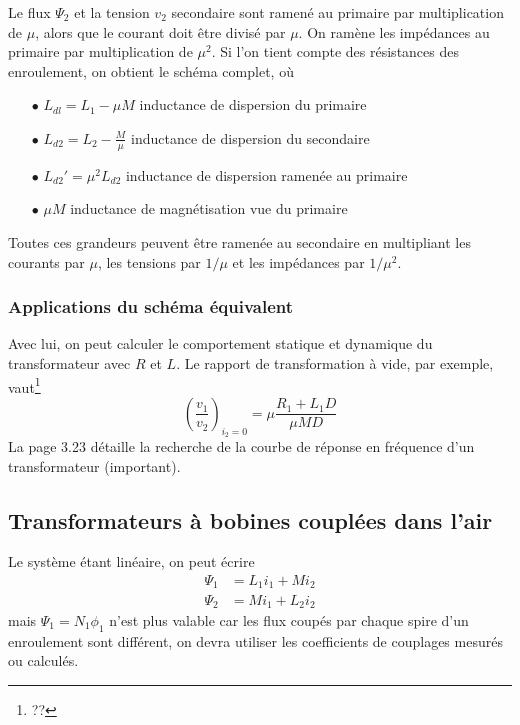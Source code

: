 		Le flux $\Psi_2$ et la tension $v_2$ secondaire sont ramené au primaire 
		par multiplication de $\mu$, alors que le courant doit être divisé par $
		\mu$. On ramène les impédances au primaire par multiplication de $\mu^2$.
		Si l'on tient compte des résistances des enroulement, on obtient le schéma 
		complet, où
		\begin{itemize}
		\item[$\bullet$] $L_{dl} = L_1-\mu M$ inductance de dispersion du primaire
		\item[$\bullet$] $L_{d2} = L_2-\frac{M}{\mu}$ inductance de dispersion du 
		secondaire
		\item[$\bullet$] $L_{d2}' = \mu^2L_{d2}$ inductance de dispersion ramenée au 
		primaire
		\item[$\bullet$] $\mu M$ inductance de magnétisation vue du primaire
		\end{itemize}
		Toutes ces grandeurs peuvent être ramenée au secondaire en multipliant les
		courants par $\mu$, les tensions par $1/\mu$ et les impédances par $1/\mu^2$.
		
		
		\subsubsection{Applications du schéma équivalent}
		Avec lui, on peut calculer le comportement statique et dynamique du 
		transformateur avec $R$ et $L$. Le rapport de transformation à vide, par 
		exemple, vaut\footnote{??}
		\begin{equation}
		\left(\dfrac{v_1}{v_2}\right)_{i_2=0} = \mu\dfrac{R_1+L_1D}{\mu MD}
		\end{equation}
		La page 3.23 détaille la recherche de la courbe de réponse en fréquence 
		d'un transformateur (important).
		
	\subsection{Transformateurs à bobines couplées dans l'air}
		Le système étant linéaire, on peut écrire
		\begin{equation}
		\begin{array}{ll}
		\Psi_1 &= L_1i_1 + Mi_2\\
		\Psi_2 &= Mi_1 + L_2i_2
		\end{array}
		\end{equation}
		mais $\Psi_1=N_1\phi_1$ n'est plus valable car les flux coupés par chaque 
		spire d'un enroulement sont différent, on devra utiliser les coefficients 
		de couplages mesurés ou calculés.
		
